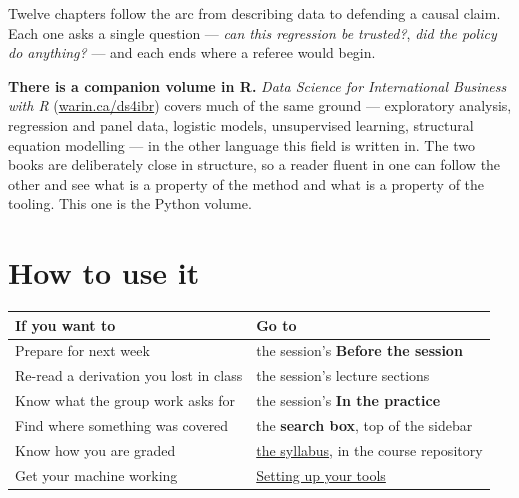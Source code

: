 \documentclass[
  letterpaper,
  10pt,
  twoside,
  openright,
  numbers=noenddot,
  chapterprefix=true]{scrbook}
\newenvironment{qmibmuted}{\begingroup\small\color{econmuted}}{\par\endgroup}
\begin{document}
Twelve chapters follow the arc from describing data to defending a
causal claim. Each one asks a single question --- \emph{can this
regression be trusted?}, \emph{did the policy do anything?} --- and each
ends where a referee would begin.

\begin{qmibmuted}

\textbf{There is a companion volume in R.} \emph{Data Science for
International Business with R}
(\href{https://warin.ca/ds4ibr/}{warin.ca/ds4ibr}) covers much of the
same ground --- exploratory analysis, regression and panel data,
logistic models, unsupervised learning, structural equation modelling
--- in the other language this field is written in. The two books are
deliberately close in structure, so a reader fluent in one can follow
the other and see what is a property of the method and what is a
property of the tooling. This one is the Python volume.

\end{qmibmuted}

\section*{How to use it}\label{how-to-use-it}


\begin{longtable}[]{@{}
  >{\raggedright\arraybackslash}p{}
  >{\raggedright\arraybackslash}p{}@{}}
\toprule\noalign{}
\begin{minipage}[b]{\linewidth}\raggedright
If you want to
\end{minipage} & \begin{minipage}[b]{\linewidth}\raggedright
Go to
\end{minipage} \\
\midrule\noalign{}
\endhead
\bottomrule\noalign{}
\endlastfoot
Prepare for next week & the session's \textbf{Before the session} \\
Re-read a derivation you lost in class & the session's lecture
sections \\
Know what the group work asks for & the session's \textbf{In the
practice} \\
Find where something was covered & the \textbf{search box}, top of the
sidebar \\
Know how you are graded &
\href{https://github.com/warint/quantitative-methods/blob/main/SYLLABUS.md}{the
syllabus}, in the course repository \\
Get your machine working & \href{setup.qmd}{Setting up your tools} \\
\end{longtable}
\end{document}
